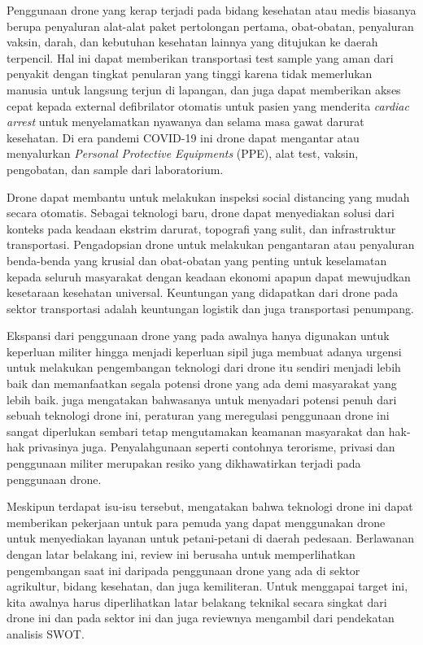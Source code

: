 Penggunaan drone yang kerap terjadi pada bidang kesehatan atau medis biasanya berupa penyaluran alat-alat paket pertolongan pertama, obat-obatan, penyaluran vaksin, darah, dan kebutuhan kesehatan lainnya yang ditujukan ke daerah terpencil. Hal ini dapat memberikan transportasi test sample yang aman dari penyakit dengan tingkat penularan yang tinggi karena tidak memerlukan manusia untuk langsung terjun di lapangan, dan juga dapat memberikan akses cepat kepada external defibrilator otomatis untuk pasien yang menderita \emph{cardiac arrest} untuk menyelamatkan nyawanya\citep{AYAMGA2021120677} dan selama masa gawat darurat kesehatan. Di era pandemi COVID-19 ini drone dapat mengantar atau menyalurkan \emph{Personal Protective Equipments} (PPE), alat test, vaksin, pengobatan, dan sample dari laboratorium. 

Drone dapat membantu untuk melakukan inspeksi social distancing yang mudah secara otomatis\citep{Ramadass2020ApplyingDL}. Sebagai teknologi baru, drone dapat menyediakan solusi dari konteks pada keadaan ekstrim darurat, topografi yang sulit, dan infrastruktur transportasi. Pengadopsian drone untuk melakukan pengantaran atau penyaluran benda-benda yang krusial dan obat-obatan yang penting untuk keselamatan kepada seluruh masyarakat dengan keadaan ekonomi apapun dapat mewujudkan kesetaraan kesehatan universal\citep{mccall2019}. Keuntungan yang didapatkan dari drone pada sektor transportasi adalah keuntungan logistik dan juga transportasi penumpang\citep{KELLERMANN2020100088}.

Ekspansi dari penggunaan drone yang pada awalnya hanya digunakan untuk keperluan militer hingga menjadi keperluan sipil juga membuat adanya urgensi untuk melakukan pengembangan teknologi dari drone itu sendiri menjadi lebih baik dan memanfaatkan segala potensi drone yang ada demi masyarakat yang lebih baik. \cite[Greenwood (2016)]{Greenwood} juga mengatakan bahwasanya untuk menyadari potensi penuh dari sebuah teknologi drone ini, peraturan yang meregulasi penggunaan drone ini sangat diperlukan sembari tetap mengutamakan keamanan masyarakat dan hak-hak privasinya juga. Penyalahgunaan seperti contohnya terorisme, privasi dan penggunaan militer merupakan resiko yang dikhawatirkan terjadi pada penggunaan drone\citep{risa2015}.

Meskipun terdapat isu-isu tersebut, \cite[Sylvester (2018)]{sylvester2018agriculture} mengatakan bahwa teknologi drone ini dapat memberikan pekerjaan untuk para pemuda yang dapat menggunakan drone untuk menyediakan layanan untuk petani-petani di daerah pedesaan. Berlawanan dengan latar belakang ini, review ini berusaha untuk memperlihatkan pengembangan saat ini daripada penggunaan drone yang ada di sektor agrikultur, bidang kesehatan, dan juga kemiliteran. Untuk menggapai target ini, kita awalnya harus diperlihatkan latar belakang teknikal secara singkat dari drone ini dan pada sektor ini dan juga reviewnya mengambil dari pendekatan analisis SWOT.

